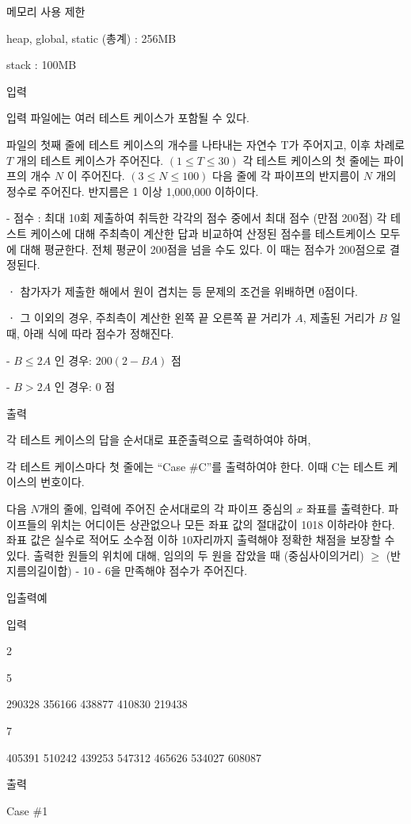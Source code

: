 \documentclass [12pt] {oblivoir}
\begin{document}
메모리 사용 제한

heap, global, static (총계) : 256MB

stack : 100MB

입력

입력 파일에는 여러 테스트 케이스가 포함될 수 있다.

파일의 첫째 줄에 테스트 케이스의 개수를 나타내는 자연수 T가 주어지고,
이후 차례로 $T$ 개의 테스트 케이스가 주어진다. $(1 \le T \le 30 )$
각 테스트 케이스의 첫 줄에는 파이프의 개수 $N$ 이 주어진다. $(3 \le N \le 100 )$
다음 줄에 각 파이프의 반지름이 $N$ 개의 정수로 주어진다.
반지름은 1 이상 1,000,000 이하이다.

- 점수 : 최대 10회 제출하여 취득한 각각의 점수 중에서 최대 점수 (만점 200점)
각 테스트 케이스에 대해 주최측이 계산한 답과 비교하여 산정된 점수를 테스트케이스 모두에 대해 평균한다. 전체 평균이 200점을 넘을 수도 있다.
이 때는 점수가 200점으로 결정된다.

 ㆍ 참가자가 제출한 해에서 원이 겹치는 등 문제의 조건을 위배하면 0점이다.

 ㆍ 그 이외의 경우, 주최측이 계산한 왼쪽 끝 오른쪽 끝 거리가 $A$, 제출된 거리가 $B$ 일때, 아래 식에 따라 점수가 정해진다.

    -  $B \le 2A$ 인 경우: $200(2 - BA)$ 점

    -  $B > 2A$ 인 경우: $0$ 점

출력

각 테스트 케이스의 답을 순서대로 표준출력으로 출력하여야 하며,

각 테스트 케이스마다 첫 줄에는 “Case \#C”를 출력하여야 한다. 이때 C는 테스트 케이스의 번호이다.

다음 $N$개의 줄에, 입력에 주어진 순서대로의 각 파이프 중심의 $x$ 좌표를 출력한다.
파이프들의 위치는 어디이든 상관없으나 모든 좌표 값의 절대값이 1018 이하라야 한다.
좌표 값은 실수로 적어도 소수점 이하 10자리까지 출력해야 정확한 채점을 보장할 수 있다.
출력한 원들의 위치에 대해, 임의의 두 원을 잡았을 때 (중심사이의거리) $\ge$ (반지름의길이합) - 10 - 6을 만족해야 점수가 주어진다.

입출력예

입력

2

5

290328 356166 438877 410830 219438

7

405391 510242 439253 547312 465626 534027 608087

출력

Case \#1
\end{document}
